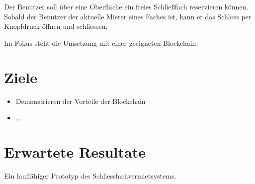 Der Benutzer soll über eine Oberfläche ein freies Schließfach reservieren können. Sobald der Benutzer der aktuelle Mieter eines Faches ist, kann er das Schloss per Knopfdruck öffnen und schliessen.

Im Fokus steht die Umsetzung mit einer geeigneten Blockchain.

\section{Ziele}
\label{sec:Ziele}

\begin{itemize}
    \item Demonstrieren der Vorteile der Blockchain
    \item \dots
\end{itemize}


\section{Erwartete Resultate}
\label{sec:Erwartete_Resultate}

Ein lauffähiger Prototyp des Schliessfachvermietsystems.